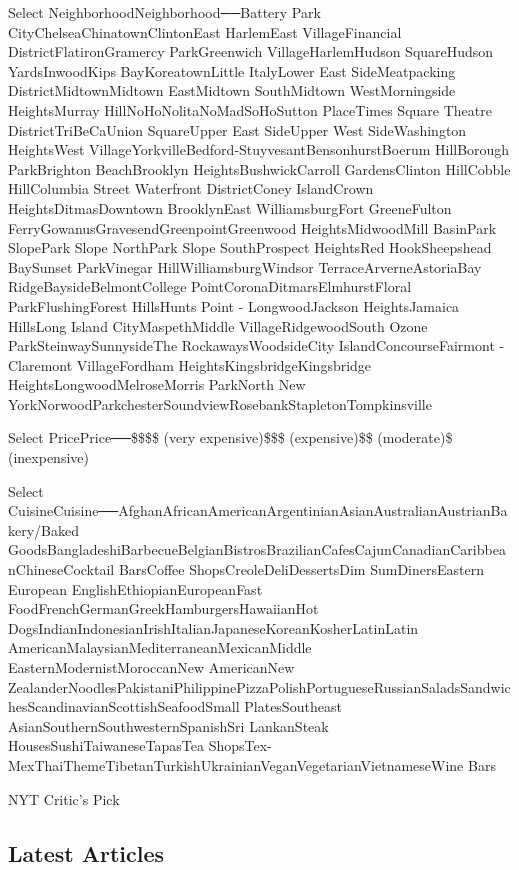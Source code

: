 Select NeighborhoodNeighborhood──Battery Park
CityChelseaChinatownClintonEast HarlemEast VillageFinancial
DistrictFlatironGramercy ParkGreenwich VillageHarlemHudson SquareHudson
YardsInwoodKips BayKoreatownLittle ItalyLower East SideMeatpacking
DistrictMidtownMidtown EastMidtown SouthMidtown WestMorningside
HeightsMurray HillNoHoNolitaNoMadSoHoSutton PlaceTimes Square Theatre
DistrictTriBeCaUnion SquareUpper East SideUpper West SideWashington
HeightsWest VillageYorkvilleBedford-StuyvesantBensonhurstBoerum
HillBorough ParkBrighton BeachBrooklyn HeightsBushwickCarroll
GardensClinton HillCobble HillColumbia Street Waterfront DistrictConey
IslandCrown HeightsDitmasDowntown BrooklynEast WilliamsburgFort
GreeneFulton FerryGowanusGravesendGreenpointGreenwood HeightsMidwoodMill
BasinPark SlopePark Slope NorthPark Slope SouthProspect HeightsRed
HookSheepshead BaySunset ParkVinegar HillWilliamsburgWindsor
TerraceArverneAstoriaBay RidgeBaysideBelmontCollege
PointCoronaDitmarsElmhurstFloral ParkFlushingForest HillsHunts Point -
LongwoodJackson HeightsJamaica HillsLong Island CityMaspethMiddle
VillageRidgewoodSouth Ozone ParkSteinwaySunnysideThe
RockawaysWoodsideCity IslandConcourseFairmont - Claremont VillageFordham
HeightsKingsbridgeKingsbridge HeightsLongwoodMelroseMorris ParkNorth New
YorkNorwoodParkchesterSoundviewRosebankStapletonTompkinsville

Select PricePrice──\$\$\$\$ (very expensive)\$\$\$ (expensive)\$\$
(moderate)\$ (inexpensive)

Select
CuisineCuisine──AfghanAfricanAmericanArgentinianAsianAustralianAustrianBakery/Baked
GoodsBangladeshiBarbecueBelgianBistrosBrazilianCafesCajunCanadianCaribbeanChineseCocktail
BarsCoffee ShopsCreoleDeliDessertsDim SumDinersEastern European
EnglishEthiopianEuropeanFast FoodFrenchGermanGreekHamburgersHawaiianHot
DogsIndianIndonesianIrishItalianJapaneseKoreanKosherLatinLatin
AmericanMalaysianMediterraneanMexicanMiddle EasternModernistMoroccanNew
AmericanNew
ZealanderNoodlesPakistaniPhilippinePizzaPolishPortugueseRussianSaladsSandwichesScandinavianScottishSeafoodSmall
PlatesSoutheast AsianSouthernSouthwesternSpanishSri LankanSteak
HousesSushiTaiwaneseTapasTea
ShopsTex-MexThaiThemeTibetanTurkishUkrainianVeganVegetarianVietnameseWine
Bars

NYT Critic's Pick

\hypertarget{latest-articles}{%
\subsection{Latest Articles}\label{latest-articles}}

